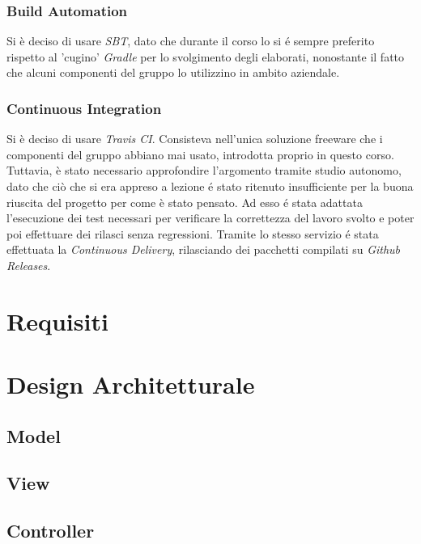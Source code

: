 \documentclass{article}
\begin{document}
    \subsubsection{Build Automation}
    Si è deciso di usare \textit{SBT}, dato che durante il corso lo si é sempre preferito rispetto al 'cugino' \textit{Gradle} per lo svolgimento degli elaborati, nonostante il fatto che alcuni componenti del gruppo lo utilizzino in ambito aziendale.

    \subsubsection{Continuous Integration}
    Si è deciso di usare \textit{Travis CI}.
    Consisteva nell'unica soluzione freeware che i componenti del gruppo abbiano mai usato, introdotta proprio in questo corso.
    Tuttavia, è stato necessario approfondire l'argomento tramite studio autonomo, dato che ciò che si era appreso a lezione é stato ritenuto insufficiente per la buona riuscita del progetto per come è stato pensato.
    Ad esso é stata adattata l'esecuzione dei test necessari per verificare la correttezza del lavoro svolto e poter poi effettuare dei rilasci senza regressioni.
    Tramite lo stesso servizio é stata effettuata la \textit{Continuous Delivery}, rilasciando dei pacchetti compilati su \textit{Github Releases}.

    \newpage


    \section{Requisiti}\label{sec:requisiti}
    


    \section{Design Architetturale}\label{sec:design-architetturale}

    \subsection{Model}

    \subsection{View}

    \subsection{Controller}
\end{document}
